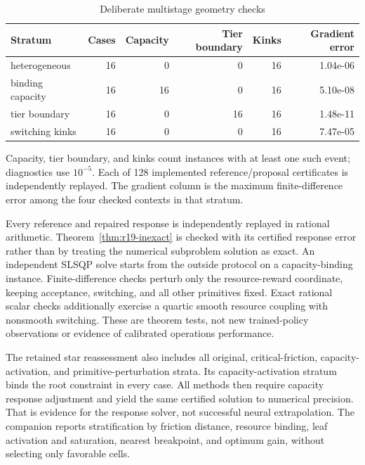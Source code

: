 \documentclass[11pt,letterpaper]{article}
\theoremstyle{definition}
\newcommand{\1}{\mathbf 1}
\begin{document}
\begin{table}[p]
\centering
\caption{Deliberate multistage geometry checks}\label{tab:r19-geometry}
\setlength{\tabcolsep}{4pt}
\begin{tabular}{lrrrrr}
\toprule
Stratum & Cases & Capacity & Tier boundary & Kinks & Gradient error \\
\midrule
heterogeneous & 16 & 0 & 0 & 16 & 1.04e-06 \\
binding capacity & 16 & 16 & 0 & 16 & 5.10e-08 \\
tier boundary & 16 & 0 & 16 & 16 & 1.48e-11 \\
switching kinks & 16 & 0 & 0 & 16 & 7.47e-05 \\
\bottomrule
\end{tabular}

\par\medskip\begin{minipage}{\textwidth}Capacity, tier boundary, and kinks count instances with at least one such event; diagnostics use $10^{-5}$. Each of 128 implemented reference/proposal certificates is independently replayed. The gradient column is the maximum finite-difference error among the four checked contexts in that stratum.\end{minipage}
\end{table}

Every reference and repaired response is independently replayed in rational arithmetic. Theorem~\ref{thm:r19-inexact} is checked with its certified response error rather than by treating the numerical subproblem solution as exact. An independent SLSQP solve starts from the outside protocol on a capacity-binding instance. Finite-difference checks perturb only the resource-reward coordinate, keeping acceptance, switching, and all other primitives fixed. Exact rational scalar checks additionally exercise a quartic smooth resource coupling with nonsmooth switching. These are theorem tests, not new trained-policy observations or evidence of calibrated operations performance.

The retained star reassessment also includes all original, critical-friction, capacity-activation, and primitive-perturbation strata. Its capacity-activation stratum binds the root constraint in every case. All methods then require capacity response adjustment and yield the same certified solution to numerical precision. That is evidence for the response solver, not successful neural extrapolation. The companion reports stratification by friction distance, resource binding, leaf activation and saturation, nearest breakpoint, and optimum gain, without selecting only favorable cells.
\end{document}
